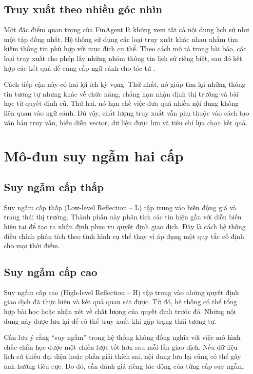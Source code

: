 \subsection{Truy xuất theo nhiều góc nhìn}
Một đặc điểm quan trọng của FinAgent là không xem tất cả nội dung lịch sử như một tập đồng nhất. Hệ thống sử dụng các loại truy xuất khác nhau nhằm tìm kiếm thông tin phù hợp với mục đích cụ thể. Theo cách mô tả trong bài báo, các loại truy xuất cho phép lấy những nhóm thông tin lịch sử riêng biệt, sau đó kết hợp các kết quả để cung cấp ngữ cảnh cho tác tử \cite{zhang2024finagent}.

Cách tiếp cận này có hai lợi ích kỳ vọng. Thứ nhất, nó giúp tìm lại những thông tin tương tự nhưng khác về chức năng, chẳng hạn nhận định thị trường và bài học từ quyết định cũ. Thứ hai, nó hạn chế việc đưa quá nhiều nội dung không liên quan vào ngữ cảnh. Dù vậy, chất lượng truy xuất vẫn phụ thuộc vào cách tạo văn bản truy vấn, biểu diễn vector, dữ liệu được lưu và tiêu chí lựa chọn kết quả.

\section{Mô-đun suy ngẫm hai cấp}

\subsection{Suy ngẫm cấp thấp}
Suy ngẫm cấp thấp (Low-level Reflection -- L) tập trung vào biến động giá và trạng thái thị trường. Thành phần này phân tích các tín hiệu gần với diễn biến hiện tại để tạo ra nhận định phục vụ quyết định giao dịch. Đây là cách hệ thống điều chỉnh phân tích theo tình hình cụ thể thay vì áp dụng một quy tắc cố định cho mọi thời điểm.

\subsection{Suy ngẫm cấp cao}
Suy ngẫm cấp cao (High-level Reflection -- H) tập trung vào những quyết định giao dịch đã thực hiện và kết quả quan sát được. Từ đó, hệ thống có thể tổng hợp bài học hoặc nhận xét về chất lượng của quyết định trước đó. Những nội dung này được lưu lại để có thể truy xuất khi gặp trạng thái tương tự.

Cần lưu ý rằng “suy ngẫm” trong hệ thống không đồng nghĩa với việc mô hình chắc chắn học được một chiến lược tốt hơn sau mỗi lần giao dịch. Nếu dữ liệu lịch sử thiếu đại diện hoặc phần giải thích sai, nội dung lưu lại cũng có thể gây ảnh hưởng tiêu cực. Do đó, cần đánh giá riêng tác động của từng cấp suy ngẫm.

